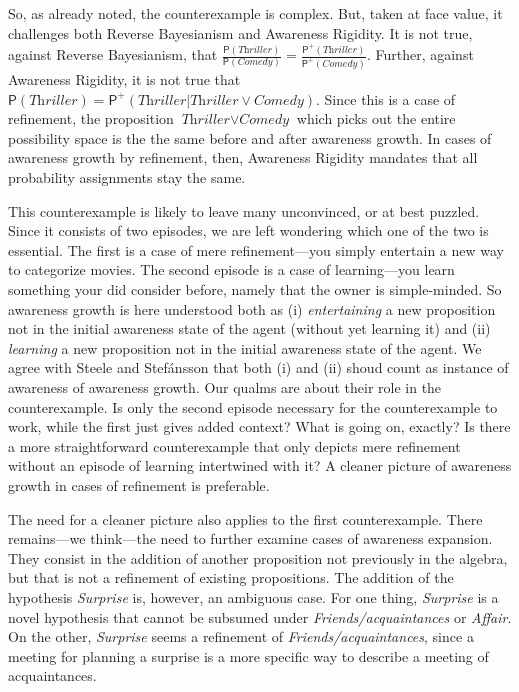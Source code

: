 \documentclass[
  11pt,
  dvipsnames,enabledeprecatedfontcommands]{scrartcl}
\newcommand{\pr}[1]{\ensuremath{\mathsf{P}(#1)}}
\newcommand{\ppr}[2]{\ensuremath{\mathsf{P}^{#1}(#2)}}
\begin{document}
So, as already noted, the counterexample is complex. But, taken at face
value, it challenges both Reverse Bayesianism and Awareness Rigidity. It
is not true, against Reverse Bayesianism, that
\(\frac{\pr{\textit{Thriller}}}{\pr{\textit{Comedy}}}=\frac{\ppr{+}{\textit{Thriller}}}{\ppr{+}{\textit{Comedy}}}\).
Further, against Awareness Rigidity, it is not true that
\(\pr{\textit{Thriller}}=\ppr{+}{\textit{Thriller} \vert \textit{Thriller}\vee \textit{Comedy}}\).
Since this is a case of refinement, the proposition
\(\textit{Thriller}\vee \textit{Comedy}\) which picks out the entire
possibility space is the the same before and after awareness growth. In
cases of awareness growth by refinement, then, Awareness Rigidity
mandates that all probability assignments stay the same.

This counterexample is likely to leave many unconvinced, or at best
puzzled. Since it consists of two episodes, we are left wondering which
one of the two is essential. The first is a case of mere
refinement---you simply entertain a new way to categorize movies. The
second episode is a case of learning---you learn something your did
consider before, namely that the owner is simple-minded. So awareness
growth is here understood both as (i) \textit{entertaining} a new
proposition not in the initial awareness state of the agent (without yet
learning it) and (ii) \textit{learning} a new proposition not in the
initial awareness state of the agent. We agree with Steele and
Stefánsson that both (i) and (ii) shoud count as instance of awareness
of awareness growth. Our qualms are about their role in the
counterexample. Is only the second episode necessary for the
counterexample to work, while the first just gives added context? What
is going on, exactly? Is there a more straightforward counterexample
that only depicts mere refinement without an episode of learning
intertwined with it? A cleaner picture of awareness growth in cases of
refinement is preferable.

The need for a cleaner picture also applies to the first counterexample.
There remains---we think---the need to further examine cases of
awareness expansion. They consist in the addition of another proposition
not previously in the algebra, but that is not a refinement of existing
propositions. The addition of the hypothesis \textit{Surprise} is,
however, an ambiguous case. For one thing, \textit{Surprise} is a novel
hypothesis that cannot be subsumed under \textit{Friends/acquaintances}
or \textit{Affair}. On the other, \textit{Surprise} seems a refinement
of \textit{Friends/acquaintances}, since a meeting for planning a
surprise is a more specific way to describe a meeting of acquaintances.
\end{document}
